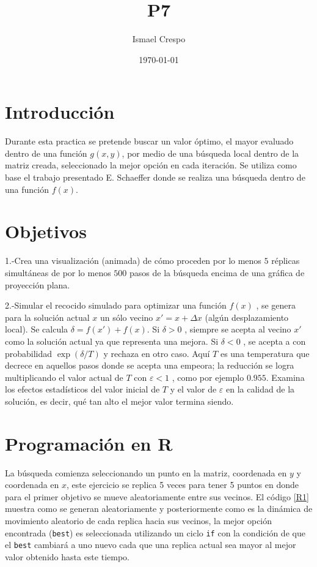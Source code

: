 \documentclass{article}
\title{P7}
\author{Ismael Crespo}
\date{\today}
\begin{document}
\maketitle

\section{Introducción}
Durante esta practica se pretende buscar un valor óptimo, el mayor evaluado dentro de una función $g(x,y)$, por medio de una búsqueda local dentro de la matriz creada, seleccionado la mejor opción en cada iteración. Se utiliza como base el trabajo presentado  E. Schaeffer \citep{E.Schaeffer} donde se realiza una búsqueda dentro de una función $f(x)$.
\section{Objetivos}
1.-Crea una visualización (animada) de cómo proceden por lo menos $5$ réplicas simultáneas de por lo menos $500$ pasos de la búsqueda encima de una gráfica de proyección plana.

2.-Simular el recocido simulado para optimizar una función $f(x)$ , se genera para la solución actual $x$ un sólo vecino $x'=x + \Delta x$ (algún desplazamiento local). Se calcula $\delta =f(x')+f(x)$. Si $\delta > 0$ , siempre se acepta al vecino $x'$ como la solución actual ya que representa una mejora. Si $\delta <0$ , se acepta a  con probabilidad $\exp (\delta /T)$  y rechaza en otro caso. Aquí $T$ es una temperatura que decrece en aquellos pasos donde se acepta una empeora; la reducción se logra multiplicando el valor actual de $T$ con $\varepsilon<1$ , como por ejemplo $0.955$. Examina los efectos estadísticos del valor inicial de $T$ y el valor de $\varepsilon$ en la calidad de la solución, es decir, qué tan alto el mejor valor termina siendo.

\section{Programación en R}
La búsqueda comienza seleccionando un punto en la matriz, coordenada en $y$ y coordenada en $x$, este ejercicio se replica 5 veces para tener 5 puntos en donde para el primer objetivo se mueve aleatoriamente entre sus vecinos. El código \ref{R1} muestra como se generan aleatoriamente y posteriormente como es la dinámica de movimiento aleatorio de cada replica hacia sus vecinos, la mejor opción encontrada (\texttt{best}) es seleccionada utilizando un ciclo \texttt{if} con la condición de que el \texttt{best} cambiará a uno nuevo cada que una replica actual sea mayor al mejor valor obtenido hasta este tiempo.
\end{document}
